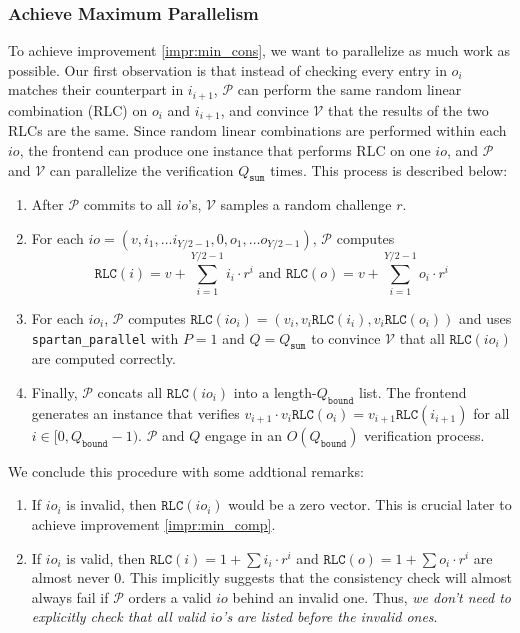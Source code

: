 \documentclass{article}
\newcommand{\code}{\texttt}
\newcommand{\Qbound}{Q_{\mathtt{bound}}}
\newcommand{\Qsum}{Q_{\mathtt{sum}}}
\renewcommand{\P}{\mathcal{P}}
\newcommand{\V}{\mathcal{V}}
\newcommand{\RLC}{\mathtt{RLC}}
\begin{document}
\subsubsection{Achieve Maximum Parallelism}

To achieve improvement \ref{impr:min_cons}, we want to parallelize as much work as possible. Our first observation is that instead of checking every entry in $o_i$ matches their counterpart in $i_{i + 1}$, $\P$ can perform the same random linear combination (RLC) on $o_i$ and $i_{i + 1}$, and convince $\V$ that the results of the two RLCs are the same. Since random linear combinations are performed within each $io$, the frontend can produce one instance that performs RLC on one $io$, and $\P$ and $\V$ can parallelize the verification $\Qsum$ times. This process is described below:
\begin{enumerate}
    \item After $\P$ commits to all $io$'s, $\V$ samples a random challenge $r$.
    \item For each $io = (v, i_1, \dots i_{Y/2 - 1}, 0, o_1, \dots o_{Y/2 - 1})$, $\P$ computes
    $$\displaystyle\RLC(i) = v + \sum_{i = 1}^{Y/2 - 1} i_i\cdot r^i \mbox{ and } \RLC(o) = v + \sum_{i = 1}^{Y/2 - 1} o_i\cdot r^i$$
    \item For each $io_i$, $\P$ computes $\RLC(io_i) = (v_i, v_i\RLC(i_i), v_i\RLC(o_i))$ and uses \code{spartan\_parallel} with $P = 1$ and $Q = \Qsum$ to convince $\V$ that all $\RLC(io_i)$ are computed correctly.
    \item Finally, $\P$ concats all $\RLC(io_i)$ into a length-$\Qbound$ list. The frontend generates an instance that verifies $v_{i+1}\cdot v_i\RLC(o_i) = v_{i+1}\RLC(i_{i+1})$ for all $i\in [0, \Qbound - 1)$. $\P$ and $Q$ engage in an $O(\Qbound)$ verification process.
\end{enumerate}

We conclude this procedure with some addtional remarks:
\begin{enumerate}
    \item If $io_i$ is invalid, then $\RLC(io_i)$ would be a zero vector. This is crucial later to achieve improvement \ref{impr:min_comp}.
    \item If $io_i$ is valid, then $\RLC(i) = 1 + \sum i_i\cdot r^i$ and $\RLC(o) = 1 + \sum o_i\cdot r^i$ are almost never 0. This implicitly suggests that the consistency check will almost always fail if $\P$ orders a valid $io$ behind an invalid one. Thus, \emph{we don't need to explicitly check that all valid $io$'s are listed before the invalid ones}.
\end{enumerate}
\end{document}
